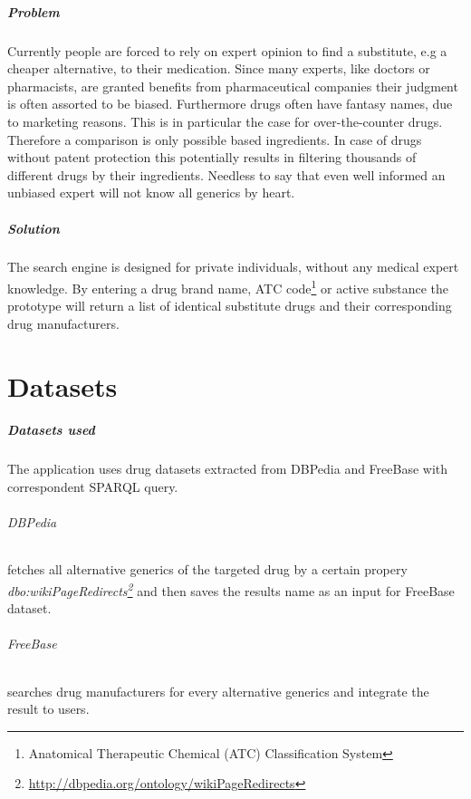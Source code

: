 \documentclass[11pt,titlepage,oneside,openany]{book}
\begin{document}
\paragraph{Problem} \label{sec:problem}
Currently people are forced to rely on expert opinion to find a substitute, e.g a cheaper alternative, to their medication. Since many experts, like doctors or pharmacists, are granted benefits from pharmaceutical companies their judgment is often assorted to be biased.
Furthermore drugs often have fantasy names, due to marketing reasons. This is in particular the case for over-the-counter drugs. Therefore a comparison is only possible based ingredients.
In case of drugs without patent protection this potentially results in filtering thousands of different drugs by their ingredients. Needless to say that even well informed an unbiased expert will not know all generics by heart.


\paragraph{Solution} 
The search engine is designed for private individuals, without any medical expert knowledge.
\label{sec:solution} %
 By entering a drug brand name, ATC code\footnote{Anatomical Therapeutic Chemical (ATC) Classification System} or active substance the prototype will return a list of identical substitute drugs and their corresponding drug manufacturers.


\chapter{Datasets}
\label{cha:datasets}

\paragraph{Datasets used}
\label{sec:datasets_used}
The application uses drug datasets extracted from DBPedia and FreeBase with correspondent SPARQL query.

\subparagraph{DBPedia}
\label{dbpedia}
fetches all alternative generics of the targeted drug by a certain propery \textit{ dbo:wikiPageRedirects\footnote{\url{http://dbpedia.org/ontology/wikiPageRedirects}}} and then saves the results name as an input for FreeBase dataset.
\subparagraph{FreeBase}
\label{freebase}
searches drug manufacturers for every alternative generics and integrate the result to users.
\end{document}

